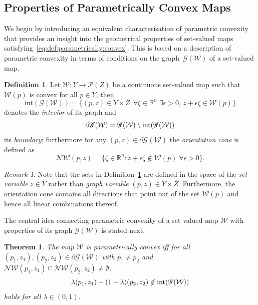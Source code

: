 \documentclass[final]{elsarticle}
\newcounter{thmcount}
\newtheorem{thm}[thmcount]{Theorem}
\theoremstyle{remark}
\newtheorem{rem}[thmcount]{Remark}
\theoremstyle{definition}
\newtheorem{defi}[thmcount]{Definition}
\begin{document}
\subsection{Properties of Parametrically Convex Maps}\label{ssec:properties:of:p:convex:maps}
%
We begin by introducing an equivalent characterisation of parametric convexity that provides an insight into the geometrical properties of 
set-valued maps satisfying~\eqref{eq:def:parametrically:convex}.
%
This is based on a description of parametric convexity in terms of conditions on the graph~$\mathscr G(\mathcal W)$ of a set-valued map.
%
\begin{defi}\label{def:graph:of:map}
Let $\mathcal W:Y\rightarrow \mathscr P(Z)$ be a continuous set-valued map
such that $\mathcal W(p)$ is convex for all $p\in Y$, then 
%
\begin{equation*}  
\text{int}(\mathscr G(\mathcal W)) = \{(p,z) \in Y\times Z : \forall \zeta\in\mathbb R^n\;\exists \epsilon>0, \, z+\epsilon \zeta\in \mathcal W(p) \}
\end{equation*}
%
denotes the \emph{interior} of its graph and
%
\[
  \partial \mathscr G(\mathcal W) = \mathscr G(\mathcal W)\setminus \textup{int}(\mathscr G(\mathcal W))
\]
%
its \emph{boundary};
%
furthermore for any $(p,z)\in\partial\mathscr G(\mathcal W)$ the \emph{orientation cone} is defined as 
%
\[
  \mathcal N\mathcal W(p,z) = \{\zeta \in\mathbb R^n: z+\epsilon \zeta \not\in \mathcal W(p)\; \forall \epsilon>0\} .
\]
%
\end{defi}
%
\begin{rem}
%
Note that the sets in Definition~\ref{def:graph:of:map} are defined in the space of the \emph{set variable} $z\in Y$ rather than \emph{graph variable} $(p,z)\in Y\times Z$.
%
Furthermore, the orientation cone contains all directions that point out of the set $\mathcal W(p)$ and hence all linear combinations thereof.
%
\end{rem}
%
The central idea connecting parametric convexity of a set valued map $\mathcal W$ with properties of its graph $\mathscr G(\mathcal W)$ is stated next.
%
\begin{thm}\label{thm:p:convexity:graph}
The map $\mathcal W$ is parametrically convex iff for all $(p_1,z_1), (p_2,z_2)\in\partial\mathscr G(\mathcal W)$
with $p_1\neq p_2$ and $\mathcal N\mathcal W(p_1,z_1)\cap\mathcal N\mathcal W(p_2,z_2)\neq\emptyset$,
%
\begin{equation}\label{eq:graph:def:p:convexity}
\lambda (p_1,z_1) + (1-\lambda) (p_2,z_2) \not\in\textup{int} (\mathscr G(\mathcal W))
\end{equation}
%
holds for all $\lambda\in(0,1)$.
%
\end{thm}
\end{document}
